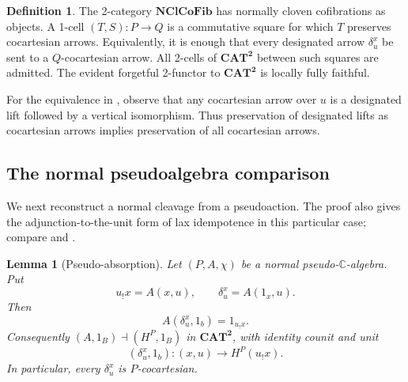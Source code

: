 \documentclass[11pt]{article}
\theoremstyle{plain}
\newtheorem{lemma}[theorem]{Lemma}
\theoremstyle{definition}
\newtheorem{definition}[theorem]{Definition}
\theoremstyle{remark}
\newcommand{\CAT}{\mathbf{CAT}}
\newcommand{\NClCoFib}{\mathbf{NClCoFib}}
\newcommand{\C}{\mathbb{C}}
\numberwithin{equation}{section}
\begin{document}
\begin{definition}\label{def:nclcofib}
The 2-category $\NClCoFib$ has normally cloven cofibrations as objects.
A 1-cell $(T,S)\colon P\to Q$ is a commutative square for which $T$
preserves cocartesian arrows.  Equivalently, it is enough that every
designated arrow $\delta^x_u$ be sent to a $Q$-cocartesian arrow.
All 2-cells of $\CAT^{\mathbf 2}$ between such squares are admitted.
The evident forgetful 2-functor to $\CAT^{\mathbf 2}$ is locally fully
faithful.
\end{definition}

For the equivalence in , observe that any
cocartesian arrow over $u$ is a designated lift followed by a vertical
isomorphism.  Thus preservation of designated lifts as cocartesian
arrows implies preservation of all cocartesian arrows.

\subsection{The normal pseudoalgebra comparison}

We next reconstruct a normal cleavage from a pseudoaction.  The proof
also gives the adjunction-to-the-unit form of lax idempotence in this
particular case; compare \citet[Sections~2.27--2.30]{Street1980} and
\citet{Kock1995}.

\begin{lemma}[Pseudo-absorption]\label{lem:pseudo-absorption}
Let $(P,A,\chi)$ be a normal pseudo-$\C$-algebra.  Put
\begin{equation}
  u_!x=A(x,u),
  \qquad
  \delta^x_u=A(1_x,u).
  \label{eq:pseudo-delta-from-action}
\end{equation}
Then
\begin{equation}
  A(\delta^x_u,1_b)=1_{u_!x}.
  \label{eq:pseudo-absorption}
\end{equation}
Consequently $(A,1_B)\dashv(H^P,1_B)$ in
$\CAT^{\mathbf 2}$, with identity counit and unit
\begin{equation*}
  (\delta^x_u,1_b)\colon(x,u)\longrightarrow H^P(u_!x).
\end{equation*}
In particular, every $\delta^x_u$ is $P$-cocartesian.
\end{lemma}
\end{document}
